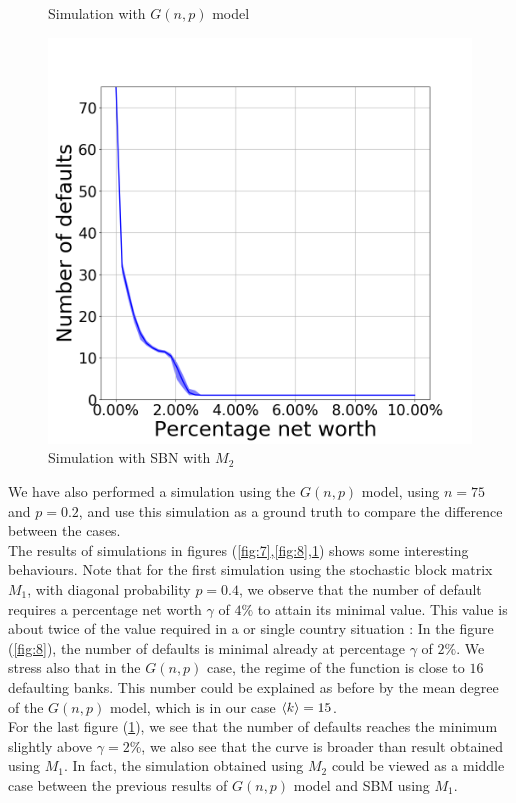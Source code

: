 \documentclass[14pt]{article}
\providecommand{\reff}[1]{(\ref{#1})}
\begin{document}
\begin{figure}[!htb]
  \caption{Simulation with $G(n,p)$ model}\label{fig:8}
\endminipage\hfill
{}%
  \includegraphics[width=\linewidth]{Figure_1N75pin65pext1.png}
  \caption{Simulation with SBN with $M_2$}\label{fig:9}
\endminipage
\end{figure}
We have also performed a simulation using the $G(n,p)$ model, using $n=75$ and $p=0.2$, and use this simulation as a ground truth to compare the difference between the  cases.
\\ The results of simulations in figures (\ref{fig:7},\ref{fig:8},\ref{fig:9}) shows some interesting behaviours. Note that for the first simulation using the stochastic block matrix $M_1$, with diagonal probability $p=0.4$, we observe that the number of default requires a percentage net worth $\gamma$ of $4\%$  to attain its minimal value. This value is about twice of the value required in a  or single country situation : In  the figure \reff{fig:8}, the number of defaults is minimal already at percentage $\gamma$ of $2 \%$. We stress also that in the $G(n,p)$ case, the  regime of the function is close to $16$ defaulting banks. This number could be explained as before by the mean degree of the $G(n,p)$ model, which is in our case $\braket{k}=15$. 
\\ For the last figure \reff{fig:9}, we see that the number of defaults reaches the minimum slightly above $\gamma=2\%$, we also see that the curve is broader than result obtained using $M_1$. In fact, the simulation obtained using $M_2$ could be viewed as a middle case between the previous results of $G(n,p)$ model and SBM using $M_1$. 
\end{document}
